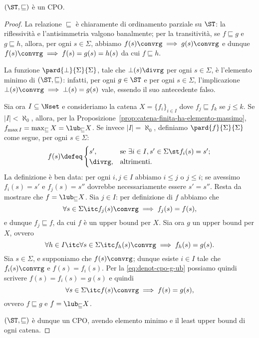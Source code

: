 \begin{proposizione}
$(\ST, \sqsubseteq)$ \`e un CPO.
\end{proposizione}
\begin{proof}
La relazione $\sqsubseteq$ \`e chiaramente di ordinamento parziale su $\ST$:
la riflessivit\`a e l'antisimmetria  valgono banalmente;
per la transitivit\`a, se $f \sqsubseteq g$ e $g \sqsubseteq h$,
allora, per ogni $s \in \Sigma$, abbiamo $f(s)\convrg \implies g(s)\convrg$
e dunque $f(s)\convrg \implies f(s) = g(s) = h(s)$ da cui
$f \sqsubseteq h$.

La funzione $\pard{\bot}{\Sigma}{\Sigma}$, tale che $\bot(s)\divrg$
per ogni $s \in \Sigma$, \`e l'elemento minimo di $(\ST, \sqsubseteq)$:
infatti, per ogni $g \in \ST$ e per ogni $s \in \Sigma$, l'implicazione
$\bot(s)\convrg \implies \bot(s) = g(s)$ vale, essendo il suo
antecedente falso.

Sia ora $I \subseteq \Nset$ e consideriamo la catena
$X = \{f_i\}_{i \in I}$ dove $f_j \sqsubseteq f_k$ se $j \leq k$.
Se $|I| < \aleph_0$, allora,
per la Proposizione~\ref{prop:catena-finita-ha-elemento-massimo},
$f_{\max I} = \max_{\sqsubseteq} X = \lub_{\sqsubseteq} X$.
Se invece $|I| = \aleph_0$, definiamo $\pard{f}{\Sigma}{\Sigma}$
come segue, per ogni $s \in \Sigma$:
\[
  f(s)
    \defeq
      \begin{cases}
        s', &\text{se $\exists i \in I, s' \in \Sigma \st f_i(s) = s'$;}  \\
      \divrg, &\text{altrimenti.}
    \end{cases}
\]
La definizione \`e ben data: per ogni $i, j \in I$ abbiamo $i \leq j$
o $j \leq i$;  se avessimo $f_i(s) = s'$ e $f_j(s) = s''$ dovrebbe
necessariamente essere $s' = s''$.
Resta da mostrare che $f = \lub_{\sqsubseteq} X$.
Sia $j \in I$: per definizione di $f$ abbiamo che
\[
  \forall s \in \Sigma \itc f_j(s)\convrg \implies f_j(s) = f(s),
\]
e dunque $f_j \sqsubseteq f$, da cui $f$ \`e un upper bound per $X$.
Sia ora $g$ un upper bound per $X$, ovvero
\begin{equation}
\label{eq:denot-cpo-g-ub}
  \forall h \in I
    \itc \forall s \in \Sigma \itc f_h(s)\convrg \implies f_h(s) = g(s).
\end{equation}
Sia $s \in \Sigma$, e supponiamo che $f(s)\convrg$;
dunque esiste $i \in I$ tale che $f_i(s)\convrg$ e $f(s) = f_i(s)$.
Per la \eqref{eq:denot-cpo-g-ub} possiamo quindi scrivere
$f(s) = f_i(s) = g(s)$ e quindi
\[
  \forall s \in \Sigma \itc f(s)\convrg \implies f(s) = g(s),
\]
ovvero $f \sqsubseteq g$ e $f = \lub_{\sqsubseteq} X$.

$(\ST, \sqsubseteq)$ \`e dunque un CPO, avendo elemento minimo
e il least upper bound di ogni catena.
\end{proof}


